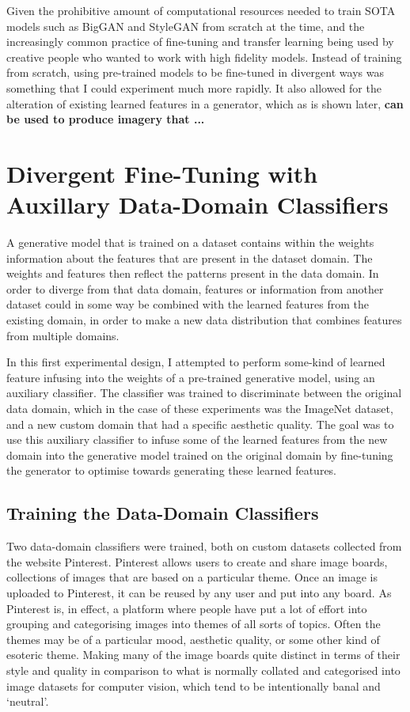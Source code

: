 Given the prohibitive amount of computational resources needed to train SOTA models such as BigGAN and StyleGAN from scratch at the time, and the increasingly common practice of fine-tuning and transfer learning being used by creative people who wanted to work with high fidelity models. 
Instead of training from scratch, using pre-trained models to be fine-tuned in divergent ways was something that I could experiment much more rapidly. 
It also allowed for the alteration of existing learned features in a generator, which as is shown later, \textbf{can be used to produce imagery that ...}

\section{Divergent Fine-Tuning with Auxillary Data-Domain Classifiers}

A generative model that is trained on a dataset contains within the weights information about the features that are present in the dataset domain. 
The weights and features then reflect the patterns present in the data domain. 
In order to diverge from that data domain, features or information from another dataset could in some way be combined with the learned features from the existing domain, in order to make a new data distribution that combines features from multiple domains.

In this first experimental design, I attempted to perform some-kind of learned feature infusing into the weights of a pre-trained generative model, using an auxiliary classifier. 
The classifier was trained to discriminate between the original data domain, which in the case of these experiments was the ImageNet dataset, and a new custom domain that had a specific aesthetic quality. 
The goal was to use this auxiliary classifier to infuse some of the learned features from the new domain into the generative model trained on the original domain by fine-tuning the generator to optimise towards generating these learned features. 

\subsection{Training the Data-Domain Classifiers}

Two data-domain classifiers were trained, both on custom datasets collected from the website Pinterest. Pinterest allows users to create and share image boards, collections of images that are based on a particular theme. 
Once an image is uploaded to Pinterest, it can be reused by any user and put into any board. 
As Pinterest is, in effect, a platform where people have put a lot of effort into grouping and categorising images into themes of all sorts of topics. 
Often the themes may be of a particular mood, aesthetic quality, or some other kind of esoteric theme. 
Making many of the image boards quite distinct in terms of their style and quality in comparison to what is normally collated and categorised into image datasets for computer vision, which tend to be intentionally banal and `neutral’.

